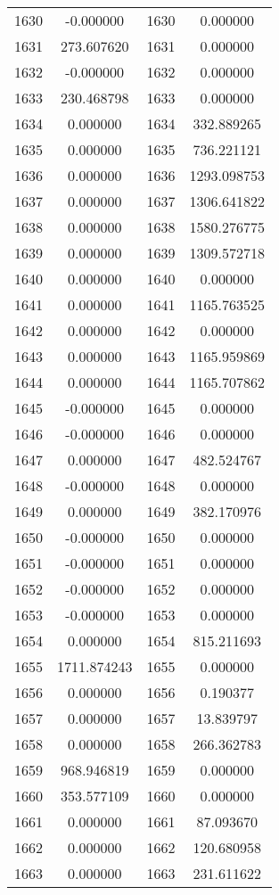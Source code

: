 \documentclass[12pt]{article}
\begin{document}
\begin{longtable}{@{}cccc@{}}
1630 & -0.000000 & 1630 & 0.000000 \\
1631 & 273.607620 & 1631 & 0.000000 \\
1632 & -0.000000 & 1632 & 0.000000 \\
1633 & 230.468798 & 1633 & 0.000000 \\
1634 & 0.000000 & 1634 & 332.889265 \\
1635 & 0.000000 & 1635 & 736.221121 \\
1636 & 0.000000 & 1636 & 1293.098753 \\
1637 & 0.000000 & 1637 & 1306.641822 \\
1638 & 0.000000 & 1638 & 1580.276775 \\
1639 & 0.000000 & 1639 & 1309.572718 \\
1640 & 0.000000 & 1640 & 0.000000 \\
1641 & 0.000000 & 1641 & 1165.763525 \\
1642 & 0.000000 & 1642 & 0.000000 \\
1643 & 0.000000 & 1643 & 1165.959869 \\
1644 & 0.000000 & 1644 & 1165.707862 \\
1645 & -0.000000 & 1645 & 0.000000 \\
1646 & -0.000000 & 1646 & 0.000000 \\
1647 & 0.000000 & 1647 & 482.524767 \\
1648 & -0.000000 & 1648 & 0.000000 \\
1649 & 0.000000 & 1649 & 382.170976 \\
1650 & -0.000000 & 1650 & 0.000000 \\
1651 & -0.000000 & 1651 & 0.000000 \\
1652 & -0.000000 & 1652 & 0.000000 \\
1653 & -0.000000 & 1653 & 0.000000 \\
1654 & 0.000000 & 1654 & 815.211693 \\
1655 & 1711.874243 & 1655 & 0.000000 \\
1656 & 0.000000 & 1656 & 0.190377 \\
1657 & 0.000000 & 1657 & 13.839797 \\
1658 & 0.000000 & 1658 & 266.362783 \\
1659 & 968.946819 & 1659 & 0.000000 \\
1660 & 353.577109 & 1660 & 0.000000 \\
1661 & 0.000000 & 1661 & 87.093670 \\
1662 & 0.000000 & 1662 & 120.680958 \\
1663 & 0.000000 & 1663 & 231.611622 \\

\end{longtable}
\end{document}
